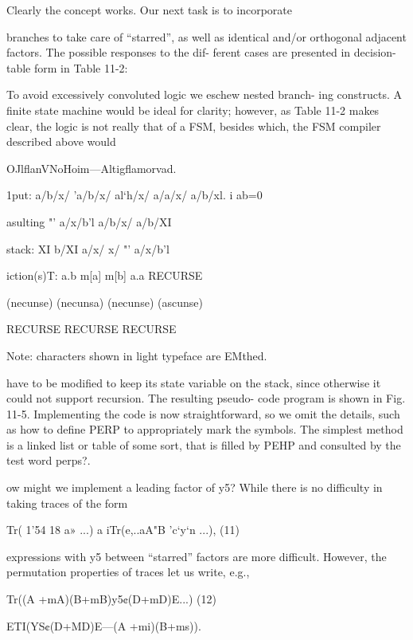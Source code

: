 Clearly the concept works. Our next task is to incorporate

branches to take care of “starred”, as well as identical and/or
orthogonal adjacent factors. The possible responses to the dif-
ferent cases are presented in decision-table form in Table 11-2:

To avoid excessively convoluted logic we eschew nested branch-
ing constructs. A finite state machine would be ideal for clarity;
however, as Table 11-2 makes clear, the logic is not really that of
a FSM, besides which, the FSM compiler described above would

OJlﬂanVNoHoim—Altigﬂamorvad.

 

 

1put: a/b/x/ 'a/b/x/ al‘h/x/ a/a/x/ a/b/xl. i
ab=0

asulting "' a/x/b'l a/b/x/ a/b/XI

stack: XI b/XI a/x/ x/ "' a/x/b’l

iction(s)T: a.b m[a] m[b] a.a RECURSE

 

(necunse) (necunsa) (necunse) (ascunse)

RECURSE RECURSE RECURSE

 

Note: characters shown in light typeface are EMthed.

 

have to be modified to keep its state variable on the stack, since
otherwise it could not support recursion. The resulting pseudo-
code program is shown in Fig. 11-5. Implementing the code is now
straightforward, so we omit the details, such as how to define
PERP to appropriately mark the symbols. The simplest method
is a linked list or table of some sort, that is filled by PEHP and
consulted by the test word perps?.

ow might we implement a leading factor of y5? While there
is no difficulty in taking traces of the form

Tr( 1'54 18 a» ...) a iTr(e,..aA"B ’c‘y‘n ...), (11)

expressions with y5 between “starred” factors are more difficult.
However, the permutation properties of traces let us write, e.g.,

Tr((A +mA)(B+mB)y5¢(D+mD)E...)
(12)

ETI(YS¢(D+MD)E---(A +mi)(B+ms)).

 

 

 

